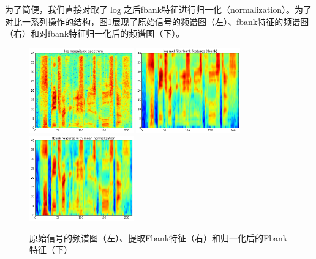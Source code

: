 为了简便，我们直接对取了$\log$之后fbank特征进行归一化（normalization）。为了对比一系列操作的结构，图\ref{fig:fbank-normalization}展现了原始信号的频谱图（左）、fbank特征的频谱图（右）和对fbank特征归一化后的频谱图（下）。
\begin{figure}[!ht]
  \centering
  \includegraphics[width=0.40\textwidth]{figure/log-power}
  \hspace{0.5cm}
  \includegraphics[width=0.40\textwidth]{figure/log-mel-fbank}
  \hspace{0.5cm}
  \includegraphics[width=0.40\textwidth]{figure/log-mel-fbank-norm}
  \caption{原始信号的频谱图（左）、提取Fbank特征（右）和归一化后的Fbank特征（下）}
\label{fig:fbank-normalization}
\end{figure}
